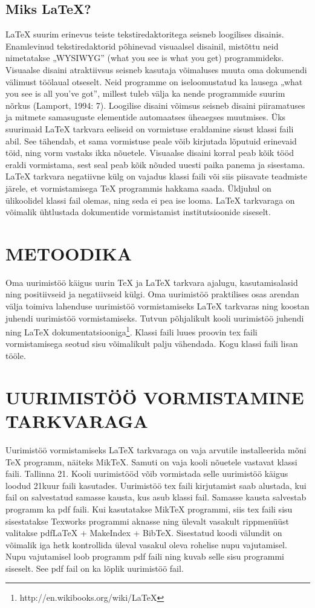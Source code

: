 \documentclass{21kuur}
\begin{document}
\section{Miks LaTeX?}
LaTeX suurim erinevus teiste tekstiredaktoritega seisneb loogilises disainis. Enamlevinud tekstiredaktorid põhinevad visuaalsel disainil, mistõttu neid nimetatakse „WYSIWYG” (what you see is what you get) programmideks. Visuaalse disaini atraktiivsus seisneb kasutaja võimaluses muuta oma dokumendi välimust töölaual otseselt. Neid programme on iseloomustatud ka lausega „what you see is all you've got”, millest tuleb välja ka nende programmide suurim nõrkus (Lamport, 1994: 7). Loogilise disaini võimsus seisneb disaini piiramatuses ja mitmete samasuguste elementide automaatses üheaegses muutmises. Üks suurimaid LaTeX tarkvara eeliseid on vormistuse eraldamine sisust klassi faili abil. See tähendab, et sama vormistuse peale võib kirjutada lõputuid erinevaid töid, ning vorm vastaks ikka nõuetele. Visuaalse disaini korral peab kõik tööd eraldi vormistama, sest seal peab kõik nõuded uuesti paika panema ja sisestama. LaTeX tarkvara negatiivne külg on vajadus klassi faili või siis piisavate teadmiste järele, et vormistamisega TeX programmis hakkama saada. Üldjuhul on ülikoolidel klassi fail olemas, ning seda ei pea ise looma. LaTeX tarkvaraga on võimalik ühtlustada dokumentide vormistamist institutsioonide siseselt.

\chapter{METOODIKA}
Oma uurimistöö käigus uurin TeX ja LaTeX tarkvara ajalugu, kasutamisalasid ning positiivseid ja negatiivseid külgi. Oma uurimistöö praktilises osas arendan välja toimiva lahenduse uurimistöö vormistamiseks LaTeX tarkvaras ning koostan juhendi uurimistöö vormistamiseks. Tutvun põhjalikult kooli uurimistöö juhendi ning LaTeX dokumentatsiooniga\footnote{http://en.wikibooks.org/wiki/LaTeX}. Klassi faili luues proovin tex faili vormistamisega seotud sisu võimalikult palju vähendada. Kogu klassi faili lisan tööle.

\chapter{UURIMISTÖÖ VORMISTAMINE \latex TARKVARAGA}
Uurimistöö vormistamiseks LaTeX tarkvaraga on vaja arvutile installeerida mõni TeX programm, näiteks MikTeX. Samuti on vaja kooli nõuetele vastavat klassi faili. Tallinna 21. Kooli uurimistööd võib vormistada selle uurimistöö käigus loodud 21kuur faili kasutades. Uurimistöö tex faili kirjutamist saab alustada, kui fail on salvestatud samasse kausta, kus asub klassi fail. Samasse kausta salvestab programm ka pdf faili. Kui kasutatakse MikTeX programmi, siis tex faili sisu sisestatakse Texworks programmi aknasse ning ülevalt vasakult rippmenüüst valitakse pdfLaTeX + MakeIndex + BibTeX. Sisestatud koodi välundit on võimalik iga hetk kontrollida üleval vasakul oleva rohelise nupu vajutamisel. Nupu vajutamisel loob programm pdf faili ning kuvab selle sisu programmi siseselt. See pdf fail on ka lõplik uurimistöö fail.
\end{document}
